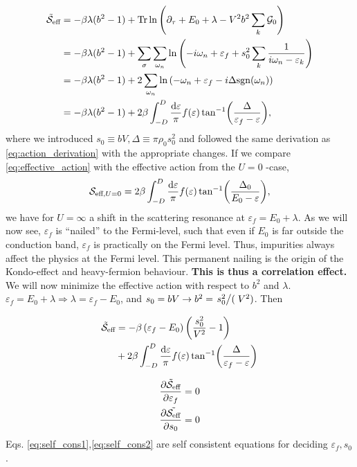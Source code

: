 \begin{align}
	\tilde{\mathcal{S}}_{\text{eff}} &= -\beta\lambda(b^2-1) + \Tr\ln\left(\partial_\tau + E_0 + \lambda-V^2b^2\sum_k\mathcal{G}_0\right)\nonumber \\
	&=-\beta\lambda(b^2-1) + \sum_\sigma\sum_{\omega_n}\ln\left(-i\omega_n + \varepsilon_f + s_0^2\sum_k\frac{1}{i\omega_n-\varepsilon_k}\right)\nonumber \\
	&= -\beta\lambda(b^2-1) + 2\sum_{\omega_n}\ln\left(-\omega_n + \varepsilon_f -i\Delta\mathrm{sgn}(\omega_n)\right)\nonumber \\
	\label{eq:effective_action}
	&= -\beta\lambda(b^2-1) + 2\beta\int_{-D}^D \frac{\dd{\varepsilon}}{\pi}f(\varepsilon)\tan[-1](\frac{\Delta}{\varepsilon_f - \varepsilon}),
\end{align}
where we introduced $s_0 \equiv bV, \Delta \equiv \pi\rho_0s_0^2$ and followed the same derivation as \eqref{eq:action_derivation} with the appropriate changes.
If we compare \eqref{eq:effective_action} with the effective action from the $U = 0$ -case,
\begin{equation}
	\mathcal{S}_{\text{eff}, U=0}  = 2\beta\int_{-D}^D\frac{\dd{\varepsilon}}{\pi}f(\varepsilon)\tan[-1](\frac{\Delta_0}{E_0 - \varepsilon}),
\end{equation}
we have for $U=\infty$ a shift in the scattering resonance at $\varepsilon_f = E_0 + \lambda$. As we will now see, $\varepsilon_f$ is ``nailed'' to the Fermi-level, such that even if $E_0$ is far outside the conduction band, $\varepsilon_f$ is practically on the Fermi level. Thus, impurities always affect the physics at the Fermi level. This permanent nailing is the origin of the Kondo-effect and heavy-fermion behaviour. \textbf{This is thus a correlation effect.}
We will now minimize the effective action with respect to $b^2$ and $\lambda$. 
$\varepsilon_f = E_0 + \lambda \Rightarrow \lambda = \varepsilon_f - E_0$, and $s_0 = bV \rightarrow b^2 = \flatfrac{s_0^2}(V^2)$. Then

\begin{align}
	\tilde{\mathcal{S}}_{\text{eff}} &=  -\beta\left(\varepsilon_f - E_0\right)\left(\frac{s_0^2}{V^2} - 1\right) \\
	&+ 2\beta\int_{-D}^D\frac{\dd{\varepsilon}}{\pi}f(\varepsilon)\tan[-1](\frac{\Delta}{\varepsilon_f-\varepsilon})
\end{align}

\begin{align}
	\label{eq:self_cons1}
	\pdv{\tilde{\mathcal{S}}_{\text{eff}}}{\varepsilon_f} &= 0 \\
	\label{eq:self_cons2}
	\pdv{\tilde{\mathcal{S}_{\text{eff}}}}{s_0}&= 0
\end{align}
Eqs. \eqref{eq:self_cons1},\eqref{eq:self_cons2} are self consistent equations for deciding $\varepsilon_f, s_0$. 

